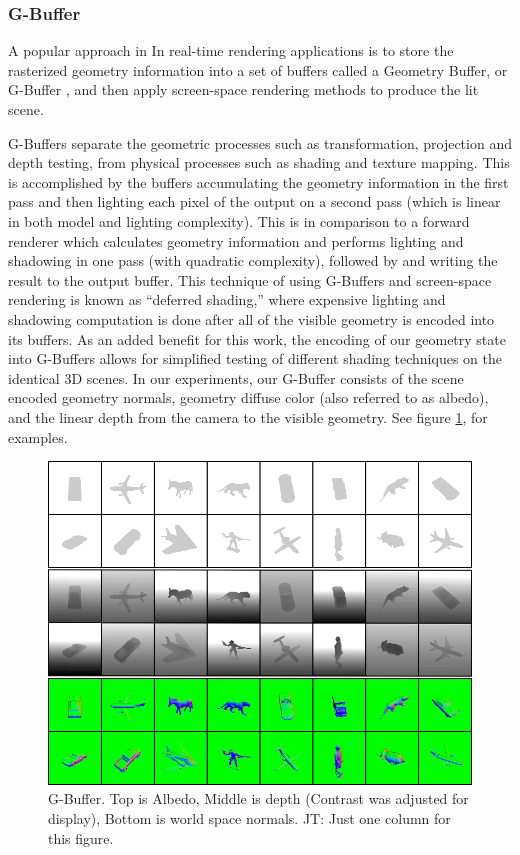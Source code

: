 \documentclass[10pt,twocolumn,letterpaper]{article}
\newcommand{\tompson}[1]{{\color{green} JT: #1}}
\begin{document}
\subsubsection{G-Buffer}

A popular approach in In real-time rendering applications is to store the rasterized geometry information into a set of buffers called a Geometry Buffer, or G-Buffer \cite{Saito:1990:CRS:97879.97901}, and then apply screen-space rendering methods to produce the lit scene.

G-Buffers separate the geometric processes such as transformation, projection and depth testing, from physical processes such as shading and texture mapping. This is accomplished by the buffers accumulating the geometry information in the first pass and then lighting each pixel of the output on a second pass (which is linear in both model and lighting complexity).  This is in comparison to a forward renderer which calculates geometry information and performs lighting and shadowing in one pass (with quadratic complexity), followed by and writing the result to the output buffer.  
This technique of using G-Buffers and screen-space rendering is known as ``deferred shading,'' where expensive lighting and shadowing computation is done after all of the visible geometry is encoded into its buffers.
 As an added benefit for this work, the encoding of our geometry state into G-Buffers allows for simplified testing of different shading techniques on the identical 3D scenes.
In our experiments, our G-Buffer consists of the scene encoded geometry normals, geometry diffuse color (also referred to as albedo), and the linear depth from the camera to the visible geometry.  See figure \ref{fig:GBUFFER_ALBEDO}, for examples.
\begin{figure}[h!]
\centering
\includegraphics[width=0.8\columnwidth]{./assets/synth_gbuffer_framed.png}
\caption{G-Buffer. Top is Albedo, Middle is depth (Contrast was adjusted for display), Bottom is world space normals. \tompson{Just one column for this figure.}}
\label{fig:GBUFFER_ALBEDO}
\end{figure}
\end{document}
